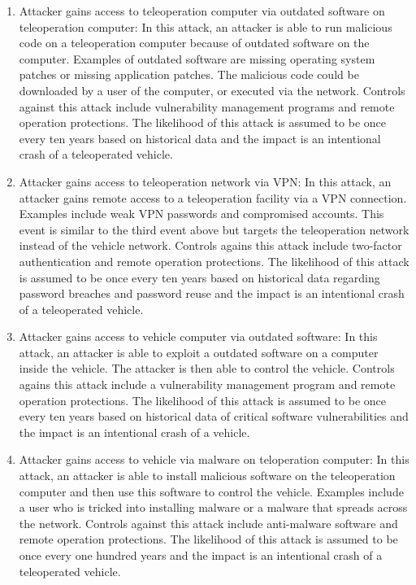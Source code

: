 \documentclass{article}
\begin{document}
\begin{enumerate}
\item Attacker gains access to teleoperation computer via outdated software on teleoperation computer: In this attack, an attacker is able to run malicious code on a teleoperation computer because of outdated software on the computer. Examples of outdated software are missing operating system patches or missing application patches. The malicious code could be downloaded by a user of the computer, or executed via the network. Controls against this attack include vulnerability management programs and remote operation protections. The likelihood of this attack is assumed to be once every ten years based on historical data and the impact is an intentional crash of a teleoperated vehicle.
\item Attacker gains access to teleoperation network via VPN: In this attack, an attacker gains remote access to a teleoperation facility via a VPN connection. Examples include weak VPN passwords and compromised accounts. This event is similar to the third event above but targets the teleoperation network instead of the vehicle network. Controls agains this attack include two-factor authentication and remote operation protections. The likelihood of this attack is assumed to be once every ten years based on historical data regarding password breaches and password reuse and the impact is an intentional crash of a teleoperated vehicle.
\item Attacker gains access to vehicle computer via outdated software: In this attack, an attacker is able to exploit a outdated software on a computer inside the vehicle. The attacker is then able to control the vehicle. Controls agains this attack include a vulnerability management program and remote operation protections. The likelihood of this attack is assumed to be once every ten years based on historical data of critical software vulnerabilities and the impact is an intentional crash of a vehicle.
\item Attacker gains access to vehicle via malware on teloperation computer: In this attack, an attacker is able to install malicious software on the teleoperation computer and then use this software to control the vehicle. Examples include a user who is tricked into installing malware or a malware that spreads across the network. Controls against this attack include anti-malware software and remote operation protections. The likelihood of this attack is assumed to be once every one hundred years and the impact is an intentional crash of a teleoperated vehicle.

\end{enumerate}
\end{document}
